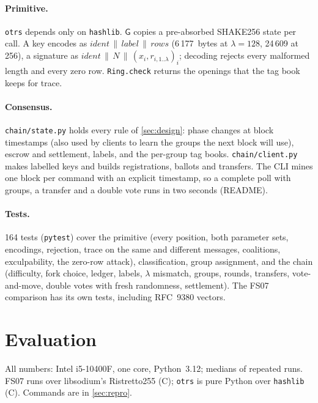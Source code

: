 \documentclass[11pt,a4paper]{article}
\newcommand{\Gf}{\mathsf{G}}
\theoremstyle{definition}
\begin{document}
\paragraph{Primitive.} \texttt{otrs} depends only on \texttt{hashlib}.
$\Gf$ copies a pre-absorbed SHAKE256 state per call. A key encodes as
$\mathit{ident} \,\|\, \mathit{label} \,\|\, \mathit{rows}$ (6\,177~bytes
at $\lambda = 128$, 24\,609 at 256), a signature as $\mathit{ident}
\,\|\, N \,\|\, (x_i, r_{i,1..\lambda})_i$; decoding rejects every
malformed length and every zero row. \texttt{Ring.check} returns the
openings that the tag book keeps for trace.

\paragraph{Consensus.} \texttt{chain/state.py} holds every rule of
\cref{sec:design}: phase changes at block timestamps (also used by clients
to learn the groups the next block will use), escrow and settlement,
labels, and the per-group tag books. \texttt{chain/client.py} makes
labelled keys and builds registrations, ballots and transfers. The CLI
mines one block per command with an explicit timestamp, so a complete poll
with groups, a transfer and a double vote runs in two seconds (README).

\paragraph{Tests.} 164 tests (\texttt{pytest}) cover the primitive (every
position, both parameter sets, encodings, rejection, trace on the same
and different messages, coalitions, exculpability, the zero-row attack),
classification, group assignment, and the chain (difficulty, fork choice,
ledger, labels, $\lambda$ mismatch, groups, rounds, transfers,
vote-and-move, double votes with fresh randomness, settlement).
The FS07 comparison has its own tests, including RFC~9380 vectors.

\section{Evaluation}
\label{sec:eval}

All numbers: Intel i5-10400F, one core, Python~3.12; medians of repeated
runs. FS07 runs over libsodium's Ristretto255 (C); \texttt{otrs} is pure
Python over \texttt{hashlib} (C). Commands are in \cref{sec:repro}.
\end{document}

